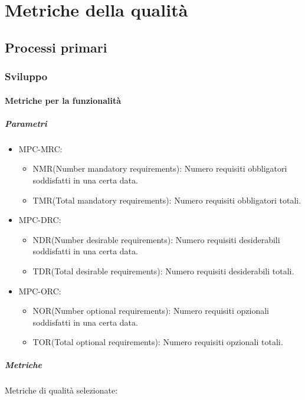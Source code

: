 \section{Metriche della qualità}
\subsection{Processi primari}
\subsubsection{Sviluppo}
\paragraph{Metriche per la funzionalità}
\subparagraph{Parametri}
\begin{itemize}
    \item MPC-MRC:
          \begin{itemize}
              \item NMR(Number mandatory requirements):  Numero requisiti obbligatori soddisfatti in una certa data.
              \item TMR(Total mandatory requirements):  Numero requisiti obbligatori totali.
          \end{itemize}
    \item MPC-DRC:
          \begin{itemize}
              \item NDR(Number desirable requirements): Numero requisiti desiderabili soddisfatti in una certa data.
              \item TDR(Total desirable requirements): Numero requisiti desiderabili totali.
          \end{itemize}
    \item MPC-ORC:
          \begin{itemize}
              \item NOR(Number optional requirements): Numero requisiti opzionali soddisfatti in una certa data.
              \item TOR(Total optional requirements): Numero requisiti opzionali totali.
          \end{itemize}
\end{itemize}
\subparagraph{Metriche}
Metriche di qualità selezionate:
